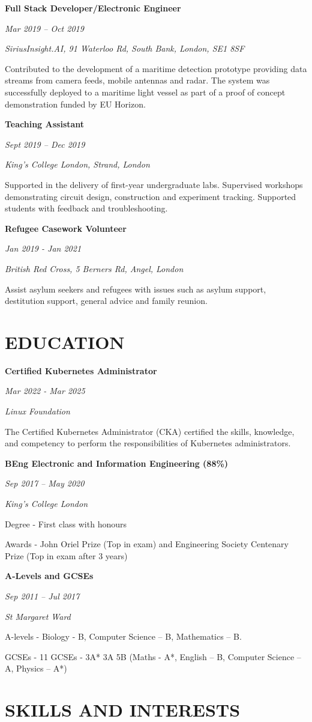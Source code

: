 \documentclass[11pt,a4paper]{article}
\newcommand{\cventry}[5]{
    \noindent
    \begin{minipage}[t]{0.3\textwidth}
        \raggedright
        \textbf{#1}
        
        \textit{#2}
    \end{minipage}%
    \hfill
    \begin{minipage}[t]{0.7\textwidth}
        \raggedright
        \textit{#3}
        
        #4
        
        #5
    \end{minipage}
    
    \vspace{8pt}
}
\newcommand{\cveducation}[6]{
    \noindent
    \begin{minipage}[t]{0.3\textwidth}
        \raggedright
        \textbf{#1}
        
        \textit{#2}
    \end{minipage}%
    \hfill
    \begin{minipage}[t]{0.7\textwidth}
        \raggedright
        \textit{#3}
        
        #4
        
        #5
        
        #6
    \end{minipage}
    
    \vspace{8pt}
}
\begin{document}
\cventry{Full Stack Developer/Electronic Engineer}{Mar 2019 – Oct 2019}{SiriusInsight.AI, 91 Waterloo Rd, South Bank, London, SE1 8SF}{}{
Contributed to the development of a maritime detection prototype providing data streams from camera feeds, mobile antennas and radar. The system was successfully deployed to a maritime light vessel as part of a proof of concept demonstration funded by EU Horizon.
}

\cventry{Teaching Assistant}{Sept 2019 – Dec 2019}{King's College London, Strand, London}{}{
Supported in the delivery of first-year undergraduate labs. Supervised workshops demonstrating circuit design, construction and experiment tracking. Supported students with feedback and troubleshooting.
}

\cventry{Refugee Casework Volunteer}{Jan 2019 - Jan 2021}{British Red Cross, 5 Berners Rd, Angel, London}{}{
Assist asylum seekers and refugees with issues such as asylum support, destitution support, general advice and family reunion.
}

\section{EDUCATION}

\cveducation{Certified Kubernetes Administrator}{Mar 2022 - Mar 2025}{Linux Foundation}{The Certified Kubernetes Administrator (CKA) certified the skills, knowledge, and competency to perform the responsibilities of Kubernetes administrators.}{}{}

\cveducation{BEng Electronic and Information Engineering (88\%)}{Sep 2017 – May 2020}{King's College London}{Degree - First class with honours}{Awards - John Oriel Prize (Top in exam) and Engineering Society Centenary Prize (Top in exam after 3 years)}{}

\cveducation{A-Levels and GCSEs}{Sep 2011 – Jul 2017}{St Margaret Ward}{A-levels - Biology - B, Computer Science – B, Mathematics – B.}{GCSEs - 11 GCSEs - 3A* 3A 5B (Maths - A*, English – B, Computer Science – A, Physics – A*)}{}

\section{SKILLS AND INTERESTS}
\end{document}
